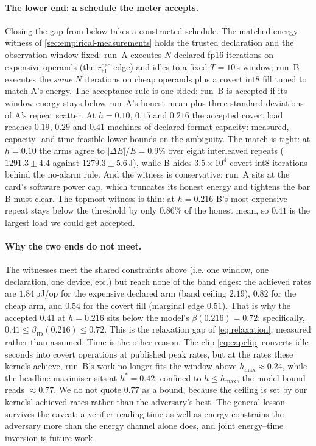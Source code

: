 \documentclass{article}
\theoremstyle{plain}
\theoremstyle{definition}
\theoremstyle{remark}
\begin{document}
\paragraph{The lower end: a schedule the meter accepts.}
Closing the gap from below takes a constructed schedule. The matched-energy
witness of \cref{sec:empirical-measurements} holds the trusted
declaration and the observation window fixed: run~A executes $N$ declared
fp16 iterations on expensive operands (the $r_{\mathrm{hi}}^{\mathrm{dec}}$
edge) and idles to a fixed $T = 10$\,s window; run~B executes the
\emph{same} $N$ iterations on cheap operands plus a covert int8 fill
tuned to match A's energy. The acceptance rule is one-sided: run~B is
accepted if its window energy stays below run~A's honest mean plus three
standard deviations of A's repeat scatter. At $h = 0.10$, $0.15$ and
$0.216$ the accepted covert load reaches $0.19$, $0.29$ and $0.41$
machines of declared-format capacity: measured, capacity- and
time-feasible lower bounds on the ambiguity. The match is tight: at
$h = 0.10$ the arms agree to $|\Delta E|/E = 0.9\%$ over eight
interleaved repeats ($1291.3 \pm 4.4$ against $1279.3 \pm 5.6$\,J), while
B hides $3.5\times 10^{4}$ covert int8 iterations behind the no-alarm
rule. And the witness is conservative: run~A sits at the card's software
power cap, which truncates its honest energy and tightens the bar B must
clear. The topmost witness is thin: at $h = 0.216$ B's most expensive
repeat stays below the threshold by only $0.86\%$ of the honest mean, so
$0.41$ is the largest load we could get accepted.

\paragraph{Why the two ends do not meet.}
The witnesses meet the shared constraints above (i.e. one window, one
declaration, one device, etc.) but reach
none of the band edges: the achieved rates are $1.84$\,pJ/op for the
expensive declared arm (band ceiling $2.19$), $0.82$ for the cheap arm,
and $0.54$ for the covert fill (marginal edge $0.51$). That is why the
accepted $0.41$ at $h = 0.216$ sits below the model's
$\beta(0.216) = 0.72$: specifically,
$0.41 \leq \beta_{\mathrm{ID}}(0.216) \leq 0.72$. This is the relaxation
gap of \cref{eq:relaxation},
measured rather than assumed. Time is the other reason. The clip
\cref{eq:capclip} converts idle seconds into covert operations at
published peak rates, but at the rates these kernels achieve,
run~B's work no longer fits the window above $h_{\max} \approx 0.24$,
while the headline maximiser sits at $h^{*} = 0.42$; confined to
$h \le h_{\max}$, the model bound reads ${\approx}0.77$. We do not quote
$0.77$ as a bound, because the ceiling is set by our kernels' achieved
rates rather than the adversary's best. The general lesson survives the
caveat: a verifier reading time as well as energy constrains the
adversary more than the energy channel alone does, and joint energy--time
inversion is future work.
\end{document}

